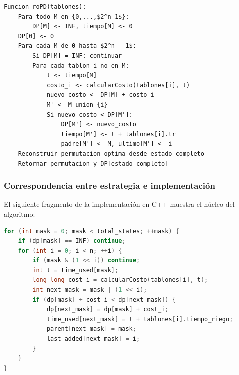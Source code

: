 \documentclass[12pt,a4paper]{article}
\begin{document}
\begin{center}
\begin{minipage}{0.94\textwidth}
\begin{lstlisting}[mathescape=true,basicstyle=\ttfamily\normalsize\linespread{1.12}\selectfont,aboveskip=0.8em,belowskip=0.8em]
Funcion roPD(tablones):
    Para todo M en {0,...,$2^n-1$}:
        DP[M] <- INF, tiempo[M] <- 0
    DP[0] <- 0
    Para cada M de 0 hasta $2^n - 1$:
        Si DP[M] = INF: continuar
        Para cada tablon i no en M:
            t <- tiempo[M]
            costo_i <- calcularCosto(tablones[i], t)
            nuevo_costo <- DP[M] + costo_i
            M' <- M union {i}
            Si nuevo_costo < DP[M']:
                DP[M'] <- nuevo_costo
                tiempo[M'] <- t + tablones[i].tr
                padre[M'] <- M, ultimo[M'] <- i
    Reconstruir permutacion optima desde estado completo
    Retornar permutacion y DP[estado completo]
\end{lstlisting}
\end{minipage}
\end{center}

\subsubsection{Correspondencia entre estrategia e implementaci\'on}

El siguiente fragmento de la implementaci\'on en C++ muestra el n\'ucleo del algoritmo:

\begin{lstlisting}[language=C++]
for (int mask = 0; mask < total_states; ++mask) {
    if (dp[mask] == INF) continue;
    for (int i = 0; i < n; ++i) {
        if (mask & (1 << i)) continue;
        int t = time_used[mask];
        long long cost_i = calcularCosto(tablones[i], t);
        int next_mask = mask | (1 << i);
        if (dp[mask] + cost_i < dp[next_mask]) {
            dp[next_mask] = dp[mask] + cost_i;
            time_used[next_mask] = t + tablones[i].tiempo_riego;
            parent[next_mask] = mask;
            last_added[next_mask] = i;
        }
    }
}
\end{lstlisting}
\end{document}
